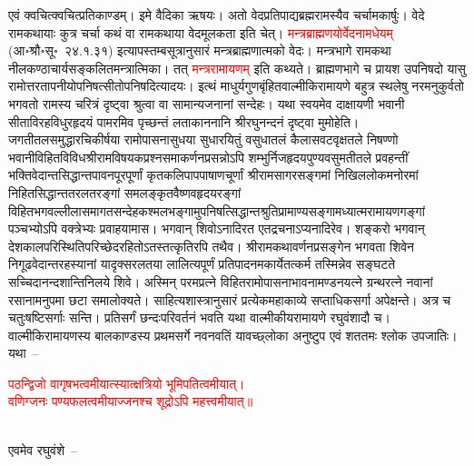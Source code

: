\begin{sloppypar}\justifying\noindent एवं क्वचित्क्वचित्प्रति\-काण्डम्। इमे वैदिका ऋषयः। अतो वेद\-प्रतिपाद्य\-ब्रह्म\-रामस्यैव चर्चामकार्षुः। वेदे राम\-कथायाः कुत्र चर्चा कथं वा राम\-कथाया वेद\-मूलकता इति चेत्। \textcolor{red}{मन्त्र\-ब्राह्मणयोर्वेदनामधेयम्} (आ॰श्रौ॰सू॰~२४.१.३१) इत्यापस्तम्ब\-सूत्रानुसारं मन्त्र\-ब्राह्मणात्मको वेदः। मन्त्र\-भागे राम\-कथा नीलकण्ठाचार्य\-सङ्कलित\-मन्त्रात्मिका। तत् \textcolor{red}{मन्त्र\-रामायणम्} इति कथ्यते। ब्राह्मण\-भागे च प्रायश उपनिषदो यासु रामोत्तर\-तापनीयोप\-निषत्सीतोप\-निषदित्यादयः। इत्थं माधुर्य\-गुण\-बृंहित\-वाल्मीकि\-रामायणे बहुत्र स्थलेषु नरमनुकुर्वतो भगवतो रामस्य चरित्रं दृष्ट्वा श्रुत्वा वा सामान्य\-जनानां सन्देहः। यथा स्वयमेव दाक्षायणी भवानी सीता\-विरह\-विधुर\-हृदयं पामरमिव पृच्छन्तं लता\-काननानि श्रीरघुनन्दनं दृष्ट्वा मुमोहेति। जगती\-तल\-समुद्धार\-चिकीर्षया रामोपासना\-सुधया सुधारयितुं वसुधा\-तलं कैलास\-वट\-वृक्ष\-तले निषण्णो भवानी\-विहित\-विविध\-श्रीराम\-विषयक\-प्रश्न\-समाकर्णन\-प्रसन्नोऽपि शम्भुर्निज\-हृदय\-पुण्य\-वसुमती\-तले प्रवहन्तीं भक्ति\-वेदान्त\-सिद्धान्त\-पावन\-पूर\-पूर्णां कृत\-कलि\-पाप\-पाषाण\-चूर्णां श्रीराम\-सागर\-सङ्गमां निखिल\-लोक\-मनोरमां निहित\-सिद्धान्त\-तरल\-तरङ्गां समलङ्कृत\-वैष्णव\-हृदय\-रङ्गां विहित\-भगवल्लीला\-समागत\-सन्देह\-कश्मल\-भङ्गामुपनिषत्सिद्धान्त\-श्रुति\-प्रामाण्य\-सङ्गामध्यात्म\-रामायण\-गङ्गां पञ्चभ्योऽपि वक्त्रेभ्यः प्रवाहयामास। भगवान् शिवोऽनादिरत एतद्रचनाऽप्यनादिरेव। शङ्करो भगवान् देश\-काल\-परिस्थिति\-परिच्छेद\-रहितोऽतस्तत्कृतिरपि तथैव। श्रीराम\-कथा\-वर्णन\-प्रसङ्गेन भगवता शिवेन निगूढ\-वेदान्त\-रहस्यानां यादृक्सरलतया लालित्य\-पूर्णं प्रतिपादनमकार्येतत्कर्म तस्मिन्नेव सङ्घटते सच्चिदानन्द\-शान्ति\-निलये शिवे। अस्मिन् परम\-प्रत्ने विहित\-रामोपासना\-भावना\-मण्डन\-यत्ने ग्रन्थ\-रत्ने नवानां रसानामनुपमा छटा समालोक्यते। साहित्य\-शास्त्रानुसारं प्रत्येक\-महा\-काव्ये सप्ताधिकसर्गा अपेक्षन्ते। अत्र च चतुःषष्टि\-सर्गाः सन्ति। प्रति\-सर्गं छन्दः\-परिवर्तनं भवति यथा वाल्मीकीय\-रामायणे रघुवंशादौ च। वाल्मीकि\-रामायणस्य बाल\-काण्डस्य प्रथम\-सर्गे नव\-नवतिं यावच्छ्लोका अनुष्टुप एवं शततमः श्लोक उपजातिः। यथा~–\end{sloppypar}
\centering\textcolor{red}{पठन्द्विजो वागृषभत्वमीयात्स्यात्क्षत्रियो भूमिपतित्वमीयात्।\nopagebreak\\
वणिग्जनः पण्यफलत्वमीयाज्जनश्च शूद्रोऽपि महत्त्वमीयात्॥}\nopagebreak\\
\\
\begin{sloppypar}\justifying\noindent एवमेव रघुवंशे~–\end{sloppypar}
